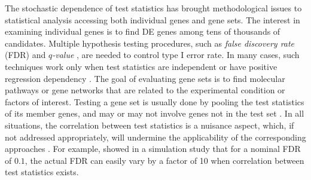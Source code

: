 	The stochastic dependence of test statistics has brought methodological issues to statistical 
	analysis accessing both individual genes and gene sets. 
	The interest in examining individual genes is to find DE genes among tens of thousands of 
	candidates. Multiple hypothesis testing 
	procedures, such as \textit{false discovery rate} (FDR) \citep{benjamini1995controlling} and 
	\textit{$q$-value} \citep{storey2003positive}, 
	are needed to control type I error rate. In many cases, such techniques work only 
	when test statistics are independent \citep{benjamini1995controlling} or 
	have positive regression dependency \citep{benjamini2001control}. The goal of evaluating gene 
	sets is to find molecular pathways or gene 
	networks that are related to the experimental condition or factors of interest. Testing a gene 
	set is usually done by pooling the test 
	statistics of its member genes, and may or may not involve genes not in the test set 
	\citep{goeman2007analyzing}. In all situations, the 
	correlation between test statistics is a nuisance aspect, which, if not addressed 
	appropriately, will undermine the applicability of the 
	corresponding approaches \citep{gatti2010heading, wu2012camera}. For
	example, \citet{efron2007correlation} showed in a simulation study that for a nominal FDR of 
	$0.1$, the actual FDR can easily vary by a factor of 10 when correlation between test 
	statistics 
	exists. 
	
